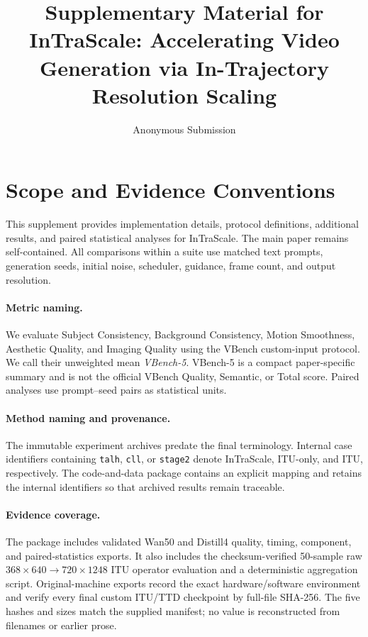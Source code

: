 \documentclass[letterpaper]{article}
\title{Supplementary Material for\\
InTraScale: Accelerating Video Generation via In-Trajectory Resolution Scaling}
\author{Anonymous Submission}
\begin{document}
\maketitle

\section{Scope and Evidence Conventions}

This supplement provides implementation details, protocol definitions,
additional results, and paired statistical analyses for InTraScale.  The main
paper remains self-contained.  All comparisons within a suite use matched text
prompts, generation seeds, initial noise, scheduler, guidance, frame count, and
output resolution.

\paragraph{Metric naming.}
We evaluate Subject Consistency, Background Consistency, Motion Smoothness,
Aesthetic Quality, and Imaging Quality using the VBench custom-input protocol.
We call their unweighted mean \emph{VBench-5}.  VBench-5 is a compact
paper-specific summary and is not the official VBench Quality, Semantic, or
Total score.  Paired analyses use prompt--seed pairs as statistical units.

\paragraph{Method naming and provenance.}
The immutable experiment archives predate the final terminology.  Internal
case identifiers containing \texttt{talh}, \texttt{cll}, or \texttt{stage2}
denote InTraScale, ITU-only, and ITU, respectively.  The code-and-data package
contains an explicit mapping and retains the internal identifiers so that
archived results remain traceable.

\paragraph{Evidence coverage.}
The package includes validated Wan50 and Distill4 quality, timing, component,
and paired-statistics exports.  It also includes the checksum-verified
50-sample raw \(368{\times}640\rightarrow720{\times}1248\) ITU operator
evaluation and a deterministic aggregation script.  Original-machine exports
record the exact hardware/software environment and verify every final custom
ITU/TTD checkpoint by full-file SHA-256.  The five hashes and sizes match the
supplied manifest; no value is reconstructed from filenames or earlier prose.
\end{document}
